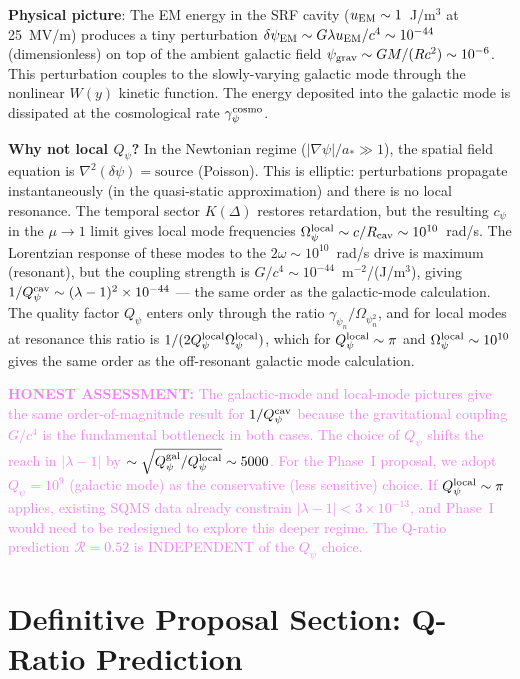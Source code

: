 \documentclass[11pt]{article}
\newcommand{\lbone}{|\lambda - 1|}
\newcommand{\ee}[1]{\times 10^{#1}}
\newcommand{\Opsi}{\Omega_\psi}
\newcommand{\gpsi}{\gamma_\psi}
\newcommand{\honest}[1]{\textcolor{violet}{\textbf{HONEST ASSESSMENT:} #1}}
\theoremstyle{definition}
\theoremstyle{remark}
\begin{document}
\textbf{Physical picture}: The EM energy in the SRF cavity
($u_{\rm EM} \sim 1$~J/m$^3$ at 25~MV/m) produces a tiny perturbation
$\delta\psi_{\rm EM} \sim G\lambda u_{\rm EM}/c^4 \sim 10^{-44}$
(dimensionless) on top of the ambient galactic field
$\psi_{\rm grav} \sim GM/(Rc^2) \sim 10^{-6}$. This perturbation
couples to the slowly-varying galactic mode through the nonlinear
$W(y)$ kinetic function. The energy deposited into the galactic
mode is dissipated at the cosmological rate $\gamma_\psi^{\rm cosmo}$.

\textbf{Why not local $Q_\psi$?} In the Newtonian regime
($|\nabla\psi|/a_* \gg 1$), the spatial field equation is
$\nabla^2(\delta\psi) = \text{source}$ (Poisson). This is elliptic:
perturbations propagate instantaneously (in the quasi-static
approximation) and there is no local resonance. The temporal
sector $K(\Delta)$ restores retardation, but the resulting
$c_\psi$ in the $\mu \to 1$ limit gives local mode frequencies
$\Opsi^{\rm local} \sim c/R_{\rm cav} \sim 10^{10}$~rad/s. The
Lorentzian response of these modes to the $2\omega \sim 10^{10}$~rad/s
drive is maximum (resonant), but the coupling strength is
$G/c^4 \sim 10^{-44}$~m$^{-2}$/(J/m$^3$), giving
$1/Q_\psi^{\rm cav} \sim (\lambda-1)^2 \times 10^{-44}$ ---
the same order as the galactic-mode calculation. The quality factor
$Q_\psi$ enters only through the ratio $\gpsi_n/\Opsi_n^2$, and
for local modes at resonance this ratio is $1/(2Q_\psi^{\rm local}
\Opsi^{\rm local})$, which for $Q_\psi^{\rm local} \sim \pi$ and
$\Opsi^{\rm local} \sim 10^{10}$ gives the same order as the
off-resonant galactic mode calculation.

\honest{The galactic-mode and local-mode pictures give the same
order-of-magnitude result for $1/Q_\psi^{\rm cav}$ because the
gravitational coupling $G/c^4$ is the fundamental bottleneck in both
cases. The choice of $Q_\psi$ shifts the reach in $|\lambda - 1|$
by $\sim \sqrt{Q_\psi^{\rm gal}/Q_\psi^{\rm local}} \sim 5000$.
For the Phase~I proposal, we adopt $Q_\psi = 10^9$ (galactic mode)
as the conservative (less sensitive) choice. If $Q_\psi^{\rm local}
\sim \pi$ applies, existing SQMS data already constrain $\lbone <
3\ee{-13}$, and Phase~I would need to be redesigned to explore this
deeper regime. The Q-ratio prediction $\mathcal{R} = 0.52$ is
INDEPENDENT of the $Q_\psi$ choice.}


\part{Definitive Proposal Section: Q-Ratio Prediction}
\label{part:proposal}
\end{document}
